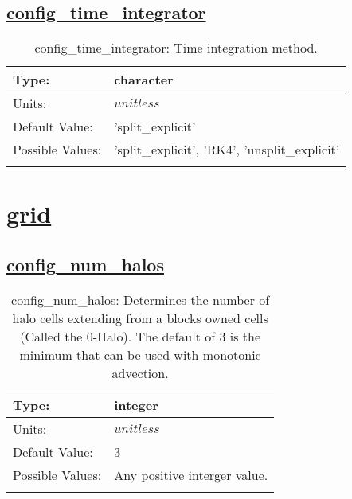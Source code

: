 \subsection[config\_time\_integrator]{\hyperref[sec:nm_tab_time_integration]{config\_time\_integrator}}
\label{subsec:nm_sec_config_time_integrator}
\begin{center}
\begin{longtable}{| p{2.0in} | p{4.0in} |}
    \hline
    Type: & character \\
    \hline
    Units: & $unitless$ \\
    \hline
    Default Value: & 'split\_explicit' \\
    \hline
    Possible Values: & 'split\_explicit', 'RK4', 'unsplit\_explicit' \\
    \hline
    \caption{config\_time\_integrator: Time integration method.}
\end{longtable}
\end{center}
\section[grid]{\hyperref[sec:nm_tab_grid]{grid}}
\label{sec:nm_sec_grid}
\subsection[config\_num\_halos]{\hyperref[sec:nm_tab_grid]{config\_num\_halos}}
\label{subsec:nm_sec_config_num_halos}
\begin{center}
\begin{longtable}{| p{2.0in} | p{4.0in} |}
    \hline
    Type: & integer \\
    \hline
    Units: & $unitless$ \\
    \hline
    Default Value: & 3 \\
    \hline
    Possible Values: & Any positive interger value. \\
    \hline
    \caption{config\_num\_halos: Determines the number of halo cells extending from a blocks owned cells (Called the 0-Halo). The default of 3 is the minimum that can be used with monotonic advection.}
\end{longtable}
\end{center}

